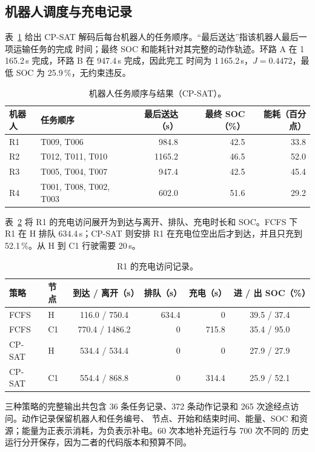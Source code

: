 \documentclass[11pt,a4paper,fontset=none]{ctexart}
\newcommand{\pct}{\,\%}
\begin{document}
\subsection{机器人调度与充电记录}

表~\ref{tab:sequences} 给出 CP-SAT 解码后每台机器人的任务顺序。“最后送达”指该机器人最后一项运输任务的完成
时间；最终 SOC 和能耗针对其完整的动作轨迹。环路 A 在 1\,165.2\,s 完成，环路 B 在 947.4\,s 完成，因此完工
时间为 1\,165.2\,s，$J = 0.4472$，最低 SOC 为 25.9\pct，无约束违反。

\begin{table}[!htbp]
\centering\small
\caption{机器人任务顺序与结果（CP-SAT）。}
\label{tab:sequences}
\begin{tabular}{llrrr}
\toprule
机器人 & 任务顺序 & 最后送达（s） & 最终 SOC（\%） & 能耗（百分点） \\
\midrule
R1 & T009, T006 & 984.8 & 42.5 & 33.8 \\
R2 & T012, T011, T010 & 1165.2 & 46.5 & 52.0 \\
R3 & T005, T004, T007 & 947.4 & 42.5 & 45.4 \\
R4 & T001, T008, T002, T003 & 602.0 & 51.6 & 29.2 \\
\bottomrule
\end{tabular}
\end{table}

表~\ref{tab:r1charge} 将 R1 的充电访问展开为到达与离开、排队、充电时长和 SOC。FCFS 下 R1 在 H 排队
634.4\,s；CP-SAT 则安排 R1 在充电位空出后才到达，并且只充到 52.1\pct。从 H 到 C1 行驶需要 20\,s。

\begin{table}[!htbp]
\centering\small
\caption{R1 的充电访问记录。}
\label{tab:r1charge}
\begin{tabular}{llcrrc}
\toprule
策略 & 节点 & 到达 / 离开（s） & 排队（s） & 充电（s） & 进 / 出 SOC（\%） \\
\midrule
FCFS & H & 116.0 / 750.4 & 634.4 & 0 & 39.5 / 37.4 \\
FCFS & C1 & 770.4 / 1486.2 & 0 & 715.8 & 35.4 / 95.0 \\
CP-SAT & H & 534.4 / 534.4 & 0 & 0 & 27.9 / 27.9 \\
CP-SAT & C1 & 554.4 / 868.8 & 0 & 314.4 & 25.9 / 52.1 \\
\bottomrule
\end{tabular}
\end{table}

三种策略的完整输出共包含 36 条任务记录、372 条动作记录和 265 次途经点访问。动作记录保留机器人和任务编号、
节点、开始和结束时间、能量、SOC 和资源；能量为正表示消耗，为负表示补电。60 次本地补充运行与 700 次不同的
历史运行分开保存，因为二者的代码版本和预算不同。
\end{document}
